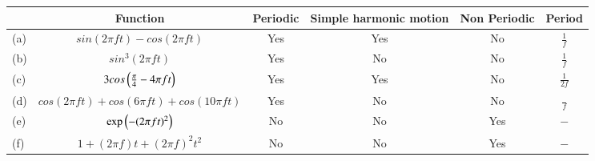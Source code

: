 \begin{tabular}{|l|c|c|c|c|c|}
  \hline
  &\textbf{Function}&\textbf{Periodic } &\textbf{Simple harmonic motion}&\textbf{Non Periodic}&\textbf{Period} \\\hline
  (a) & $sin(2\pi ft)-cos(2\pi ft)$ & Yes & Yes & No & $\frac{1}{f }$ \\\hline
  (b) & $sin^3(2\pi ft)$  & Yes & No & No & $\frac{1}{f}$\\\hline
  (c) & $3cos\left(\frac{\pi}{4}-4\pi ft\right)$ & Yes & Yes & No & $\frac{1}{2f}$\\\hline
  (d) & $cos(2\pi ft)+cos(6\pi ft)+cos(10\pi ft)$ & Yes & No & No & $\frac{}{f}$\\\hline
  (e) & $\text{exp}\left(-(2\pi ft)^2\right)$ & No & No & Yes & $-$ \\\hline
  (f) &$ 1+(2\pi f)  t+(2\pi f)  ^2t^2$ & No & No & Yes & $-$ \\\hline
 \end{tabular}

